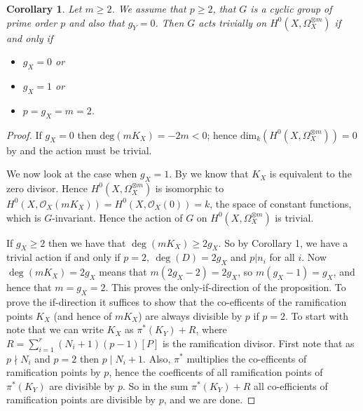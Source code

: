 \documentclass[11pt]{article} %
\newtheorem{cor}{Corollary}
\begin{document}
\begin{cor}
Let $m\geq 2$. We assume that $p\geq 2$, that $G$ is a cyclic group of prime order $p$ and also that $g_Y=0$. Then $G$ acts trivially on $H^0(X,\Omega_X^{\otimes m})$ if and only if
	\begin{itemize}
		\item
			$g_X=0$ or
		\item
			$g_X=1$ or
		\item
			$p=g_X=m=2$.
	\end{itemize}
\end{cor}
\begin{proof}
If $g_X=0$ then $\mbox{deg}(mK_X)=-2m<0$; hence $\mbox{dim}_k(H^0(X,\Omega_X^{\otimes m}))=0$ by \citep[prop. 3, {\S}8]{fulton} and the action must be trivial.

We now look at the case when $g_X=1$. By \citep[Chap. IV,\ Example 1.3.6]{hart} we know that $K_X$ is equivalent to the zero divisor. Hence $H^0(X,\Omega_X^{\otimes m})$ is isomorphic to $H^0(X,\mathscr{O}_X(mK_X))=H^0(X,\mathscr{O}_X(0))=k$, the space of constant functions, which is $G$-invariant. Hence the action of $G$ on $H^0(X,\Omega_X^{\otimes m})$ is trivial.

If $g_X\geq 2$ then we have that $\deg(mK_X)\geq 2g_X$. So by Corollary 1, we have a trivial action if and only if $p=2,\ \deg(D)=2g_X$ and $p|n_i$ for all $i$. Now $\deg(mK_X)=2g_X$ means that $m(2g_X-2)=2g_X$, so $m(g_X-1)=g_X$, and hence that $m=g_X=2$. This proves the only-if-direction of the proposition. To prove the if-direction it suffices to show that the co-efficents of the ramification points $K_X$ (and hence of $mK_X$) are always divisible by $p$ if $p=2$. To start with note that we can write $K_X$ as $\pi^*(K_Y)+R$, where $R=\sum_{i=1}^r(N_i+1)(p-1)[P]$ is the ramification divisor. First note that as $p\nmid N_i$ and $p=2$ then $p\mid N_i+1$. Also, $\pi^*$ multiplies the co-efficents of ramification points by $p$, hence the coefficents of all ramification points of $\pi^*(K_Y)$ are divisible by $p$. So in the sum $\pi^*(K_Y)+R$ all co-efficients of ramification points are divisible by $p$, and we are done.
\end{proof}




\end{document}
